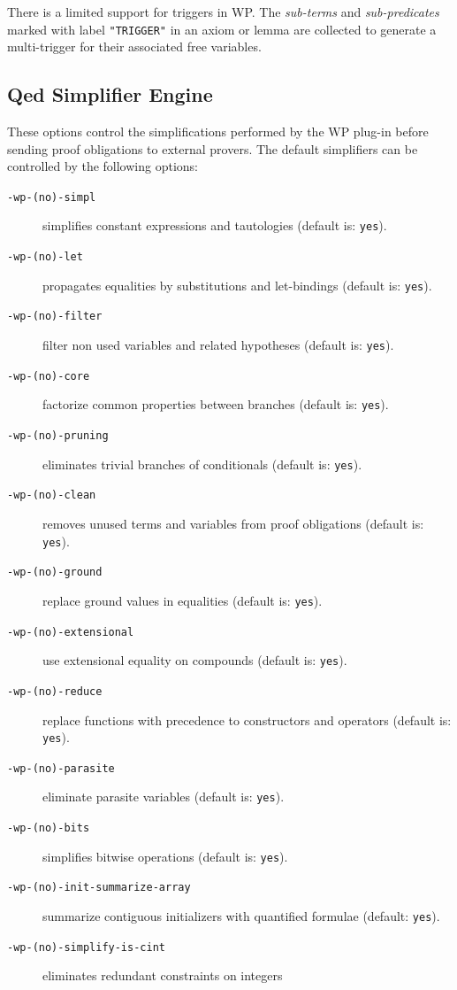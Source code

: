 There is a limited support for triggers in \textsf{WP}. The
\emph{sub-terms} and \emph{sub-predicates} marked with label
\verb+"TRIGGER"+ in an axiom or lemma are collected to generate a
multi-trigger for their associated free variables.

\subsection{Qed Simplifier Engine}

These options control the simplifications performed by the \textsf{WP} plug-in before
sending proof obligations to external provers. The default simplifiers can be
controlled by the following options:

\begin{description}
\item[\tt -wp-(no)-simpl] simplifies constant
  expressions and tautologies (default is: \texttt{yes}).
\item[\tt -wp-(no)-let] propagates equalities by substitutions
  and let-bindings (default is: \texttt{yes}).
\item[\tt -wp-(no)-filter] filter non used variables and related hypotheses
  (default is: \texttt{yes}).
\item[\tt -wp-(no)-core] factorize common properties between branches
  (default is: \texttt{yes}).
\item[\tt -wp-(no)-pruning] eliminates trivial branches of conditionals
  (default is: \texttt{yes}).
\item[\tt -wp-(no)-clean] removes unused terms and variables from
  proof obligations (default is: \texttt{yes}).
\item[\tt -wp-(no)-ground] replace ground values in equalities
  (default is: \texttt{yes}).
\item[\tt -wp-(no)-extensional] use extensional equality on compounds
  (default is: \texttt{yes}).
\item[\tt -wp-(no)-reduce] replace functions with precedence to constructors and
  operators (default is: \texttt{yes}).
\item[\tt -wp-(no)-parasite] eliminate parasite variables
  (default is: \texttt{yes}).
\item[\tt -wp-(no)-bits] simplifies bitwise operations
  (default is: \texttt{yes}).
\item[\tt -wp-(no)-init-summarize-array] summarize contiguous initializers
  with quantified formulae (default: \texttt{yes}).
\item[\tt -wp-(no)-simplify-is-cint] eliminates redundant constraints on integers

\end{description}
